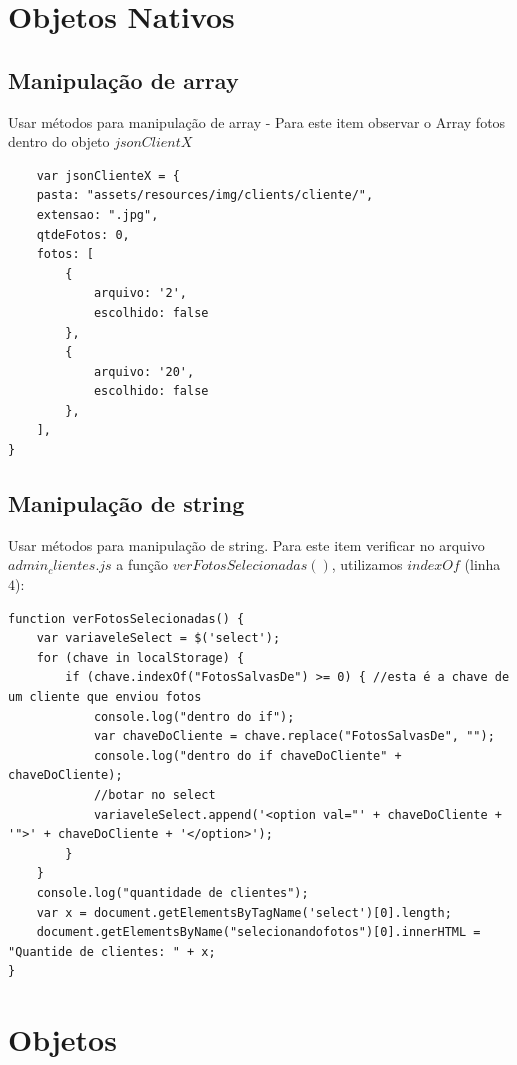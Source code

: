 \section{Objetos Nativos }
\subsection{Manipulação de array}
	Usar métodos para manipulação de array - Para este item observar o Array fotos dentro do objeto $jsonClientX$

\begin{lstlisting}	
	var jsonClienteX = {
    pasta: "assets/resources/img/clients/cliente/",
    extensao: ".jpg",
    qtdeFotos: 0,
    fotos: [
        {
            arquivo: '2',
            escolhido: false
        },
        {
            arquivo: '20',
            escolhido: false
        },
	],
}
\end{lstlisting}

\subsection{Manipulação de string}
Usar métodos para manipulação de string. Para este item verificar no arquivo $admin_clientes.js$ a função $verFotosSelecionadas()$, utilizamos $indexOf$ (linha $4$):
\begin{lstlisting}	
function verFotosSelecionadas() {
    var variaveleSelect = $('select');
    for (chave in localStorage) {
        if (chave.indexOf("FotosSalvasDe") >= 0) { //esta é a chave de um cliente que enviou fotos
            console.log("dentro do if");
            var chaveDoCliente = chave.replace("FotosSalvasDe", "");
            console.log("dentro do if chaveDoCliente" + chaveDoCliente);
            //botar no select
            variaveleSelect.append('<option val="' + chaveDoCliente + '">' + chaveDoCliente + '</option>');
        }
    }
    console.log("quantidade de clientes");
    var x = document.getElementsByTagName('select')[0].length;
    document.getElementsByName("selecionandofotos")[0].innerHTML = "Quantide de clientes: " + x;
}
\end{lstlisting}
\section{Objetos}
